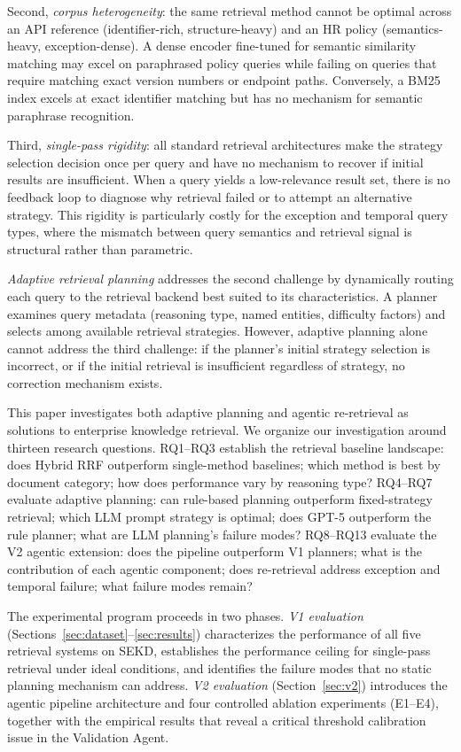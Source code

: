 \documentclass[11pt, a4paper]{article}
\begin{document}
Second, \emph{corpus heterogeneity}: the same retrieval method cannot be optimal across an API reference (identifier-rich, structure-heavy) and an HR policy (semantics-heavy, exception-dense). A dense encoder fine-tuned for semantic similarity matching may excel on paraphrased policy queries while failing on queries that require matching exact version numbers or endpoint paths. Conversely, a BM25 index excels at exact identifier matching but has no mechanism for semantic paraphrase recognition.

Third, \emph{single-pass rigidity}: all standard retrieval architectures make the strategy selection decision once per query and have no mechanism to recover if initial results are insufficient. When a query yields a low-relevance result set, there is no feedback loop to diagnose why retrieval failed or to attempt an alternative strategy. This rigidity is particularly costly for the exception and temporal query types, where the mismatch between query semantics and retrieval signal is structural rather than parametric.

\emph{Adaptive retrieval planning} addresses the second challenge by dynamically routing each query to the retrieval backend best suited to its characteristics. A planner examines query metadata (reasoning type, named entities, difficulty factors) and selects among available retrieval strategies. However, adaptive planning alone cannot address the third challenge: if the planner's initial strategy selection is incorrect, or if the initial retrieval is insufficient regardless of strategy, no correction mechanism exists.

This paper investigates both adaptive planning and agentic re-retrieval as solutions to enterprise knowledge retrieval. We organize our investigation around thirteen research questions. RQ1--RQ3 establish the retrieval baseline landscape: does Hybrid RRF outperform single-method baselines; which method is best by document category; how does performance vary by reasoning type? RQ4--RQ7 evaluate adaptive planning: can rule-based planning outperform fixed-strategy retrieval; which LLM prompt strategy is optimal; does GPT-5 outperform the rule planner; what are LLM planning's failure modes? RQ8--RQ13 evaluate the V2 agentic extension: does the pipeline outperform V1 planners; what is the contribution of each agentic component; does re-retrieval address exception and temporal failure; what failure modes remain?

The experimental program proceeds in two phases. \emph{V1 evaluation} (Sections~\ref{sec:dataset}--\ref{sec:results}) characterizes the performance of all five retrieval systems on SEKD, establishes the performance ceiling for single-pass retrieval under ideal conditions, and identifies the failure modes that no static planning mechanism can address. \emph{V2 evaluation} (Section~\ref{sec:v2}) introduces the agentic pipeline architecture and four controlled ablation experiments (E1--E4), together with the empirical results that reveal a critical threshold calibration issue in the Validation Agent.
\end{document}
